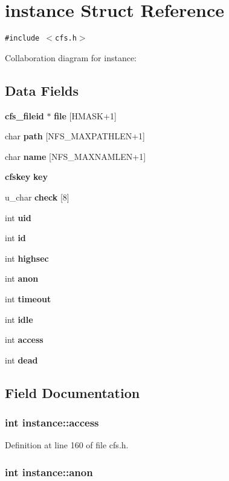 \section{instance Struct Reference}
\label{structinstance}
{\tt \#include $<$cfs.h$>$}

Collaboration diagram for instance:\subsection*{Data Fields}
\begin{CompactItemize}
\item 
{\bf cfs\_\-fileid} $\ast$ {\bf file} [HMASK+1]
\item 
char {\bf path} [NFS\_\-MAXPATHLEN+1]
\item 
char {\bf name} [NFS\_\-MAXNAMLEN+1]
\item 
{\bf cfskey} {\bf key}
\item 
u\_\-char {\bf check} [8]
\item 
int {\bf uid}
\item 
int {\bf id}
\item 
int {\bf highsec}
\item 
int {\bf anon}
\item 
int {\bf timeout}
\item 
int {\bf idle}
\item 
int {\bf access}
\item 
int {\bf dead}
\end{CompactItemize}


\subsection{Field Documentation}
\subsubsection{\setlength{\rightskip}{0pt plus 5cm}int {\bf instance::access}}\label{structinstance_o11}




Definition at line 160 of file cfs.h.
\subsubsection{\setlength{\rightskip}{0pt plus 5cm}int {\bf instance::anon}}\label{structinstance_o8}




